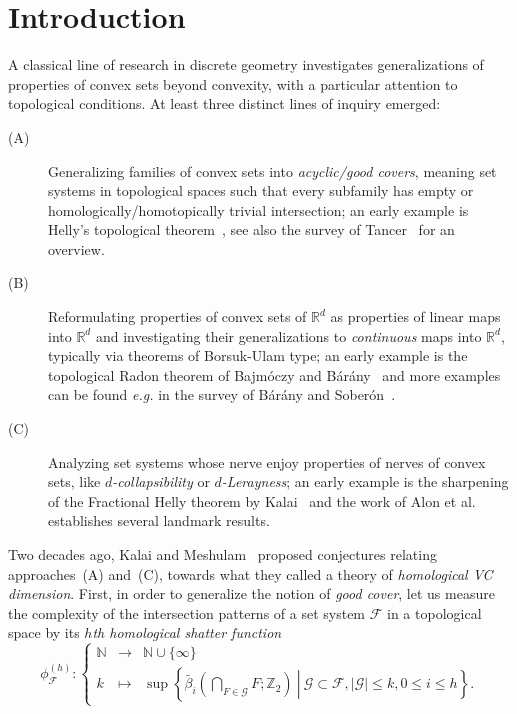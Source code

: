 \documentclass[11pt]{article}
\newcommand{\R}{\mathbb{R}}
\newcommand{\Z}{\mathbb{Z}}
\newcommand{\F}{\mathcal{F}}
\newcommand{\G}{\mathcal{G}}
\newcommand{\defn}[1]{\emph{\color{violet}#1}}
\newcommand{\pth}[1]{\left(#1\right)}
\begin{document}
\section{Introduction}
%
A classical line of research in discrete geometry investigates generalizations of properties of convex sets beyond convexity, with a particular attention to topological conditions. At least three distinct lines of inquiry emerged:
%
\begin{description}
\item[(A)] Generalizing families of convex sets into \emph{acyclic/good covers}, meaning set systems in topological spaces such that every subfamily has empty or homologically/homotopically trivial intersection; an early example is Helly's topological theorem~\cite{helly1930systeme}, see also the survey of Tancer~\cite{tancer2012intersection} for an overview.\medskip
%
\item[(B)] Reformulating properties of convex sets of $\R^d$ as properties of linear maps into $\R^d$ and investigating their generalizations to \emph{continuous} maps into $\R^d$, typically via theorems of Borsuk-Ulam type; an early example is the topological Radon theorem of Bajmóczy and Bárány~\cite{bajmoczy1979common} and more examples can be found \emph{e.g.} in the survey of Bárány and Soberón~\cite{barany2018tverberg}.\medskip
%
\item[(C)] Analyzing set systems whose nerve enjoy properties of nerves of convex sets, like \emph{$d$-collapsibility} or \emph{$d$-Lerayness}; an early example is the sharpening of the Fractional Helly theorem by Kalai~\cite{kalai1984intersection} and the work of Alon et al.~\cite{transversal-hypergraph} establishes several landmark results.
\end{description}
%
\noindent
Two decades ago, Kalai and Meshulam~\cite{KM} proposed conjectures relating approaches~(A) and~(C), towards what they called a theory of \emph{homological VC dimension}. First, in order to generalize the notion of \emph{good cover}, let us measure the complexity of the intersection patterns of a set system $\F$ in a topological space by its \defn{$h$th homological shatter function}
%
\begin{equation}\label{eq:homshat}
  \phi_{\F}^{(h)}\colon\left\{\begin{array}{rcl}
        \mathbb{N} & \rightarrow & \mathbb{N} \cup \{\infty\} \\
         k& \mapsto & \sup \left\{\left.\tilde{\beta_i}\pth{\bigcap\limits_{F\in \mathcal{G}} F;\Z_2} \ \right| \ \G\subset \F, |\G|\leq k, 0\leq i\leq h\right\}.
    \end{array}\right.
\end{equation}
\end{document}
